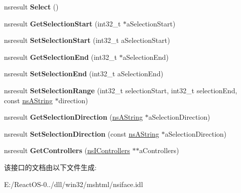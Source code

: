 \begin{DoxyCompactItemize}
\item 
\mbox{\label{interfacens_i_d_o_m_h_t_m_l_text_area_element_aae2bae329b019109fdbcdd53a4be8d3c}} 
nsresult {\bfseries Select} ()
\item 
\mbox{\label{interfacens_i_d_o_m_h_t_m_l_text_area_element_afd6743e6c544cf032635ca5045455881}} 
nsresult {\bfseries Get\+Selection\+Start} (int32\+\_\+t $\ast$a\+Selection\+Start)
\item 
\mbox{\label{interfacens_i_d_o_m_h_t_m_l_text_area_element_a1679aab0de04bdcd1a054cd37fe9ca43}} 
nsresult {\bfseries Set\+Selection\+Start} (int32\+\_\+t a\+Selection\+Start)
\item 
\mbox{\label{interfacens_i_d_o_m_h_t_m_l_text_area_element_ac0e65dddb89beb5f13d6ed95697ab120}} 
nsresult {\bfseries Get\+Selection\+End} (int32\+\_\+t $\ast$a\+Selection\+End)
\item 
\mbox{\label{interfacens_i_d_o_m_h_t_m_l_text_area_element_a943d1188138a52315aee398014707023}} 
nsresult {\bfseries Set\+Selection\+End} (int32\+\_\+t a\+Selection\+End)
\item 
\mbox{\label{interfacens_i_d_o_m_h_t_m_l_text_area_element_af3460ea37aa801817e746006ac14a8c6}} 
nsresult {\bfseries Set\+Selection\+Range} (int32\+\_\+t selection\+Start, int32\+\_\+t selection\+End, const \hyperlink{structns_string_container}{ns\+A\+String} $\ast$direction)
\item 
\mbox{\label{interfacens_i_d_o_m_h_t_m_l_text_area_element_a8d05ceaed38d705952bd07ed36eac39d}} 
nsresult {\bfseries Get\+Selection\+Direction} (\hyperlink{structns_string_container}{ns\+A\+String} $\ast$a\+Selection\+Direction)
\item 
\mbox{\label{interfacens_i_d_o_m_h_t_m_l_text_area_element_a84a30fd94b1e27817fc73aac14e4542d}} 
nsresult {\bfseries Set\+Selection\+Direction} (const \hyperlink{structns_string_container}{ns\+A\+String} $\ast$a\+Selection\+Direction)
\item 
\mbox{\label{interfacens_i_d_o_m_h_t_m_l_text_area_element_a9930364be8064352c399a229eec06141}} 
nsresult {\bfseries Get\+Controllers} (\hyperlink{interfacens_i_supports}{ns\+I\+Controllers} $\ast$$\ast$a\+Controllers)
\end{DoxyCompactItemize}


该接口的文档由以下文件生成\+:\begin{DoxyCompactItemize}
\item 
E\+:/\+React\+O\+S-\/0../dll/win32/mshtml/nsiface.\+idl\end{DoxyCompactItemize}
